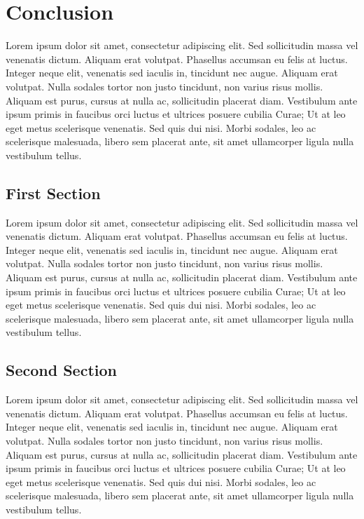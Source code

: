 \chapter{Conclusion}

Lorem ipsum dolor sit amet, consectetur adipiscing elit. Sed sollicitudin massa vel venenatis dictum. Aliquam erat volutpat. Phasellus accumsan eu felis at luctus. Integer neque elit, venenatis sed iaculis in, tincidunt nec augue. Aliquam erat volutpat. Nulla sodales tortor non justo tincidunt, non varius risus mollis. Aliquam est purus, cursus at nulla ac, sollicitudin placerat diam. Vestibulum ante ipsum primis in faucibus orci luctus et ultrices posuere cubilia Curae; Ut at leo eget metus scelerisque venenatis. Sed quis dui nisi. Morbi sodales, leo ac scelerisque malesuada, libero sem placerat ante, sit amet ullamcorper ligula nulla vestibulum tellus.

\section{First Section}
Lorem ipsum dolor sit amet, consectetur adipiscing elit. Sed sollicitudin massa vel venenatis dictum. Aliquam erat volutpat. Phasellus accumsan eu felis at luctus. Integer neque elit, venenatis sed iaculis in, tincidunt nec augue. Aliquam erat volutpat. Nulla sodales tortor non justo tincidunt, non varius risus mollis. Aliquam est purus, cursus at nulla ac, sollicitudin placerat diam. Vestibulum ante ipsum primis in faucibus orci luctus et ultrices posuere cubilia Curae; Ut at leo eget metus scelerisque venenatis. Sed quis dui nisi. Morbi sodales, leo ac scelerisque malesuada, libero sem placerat ante, sit amet ullamcorper ligula nulla vestibulum tellus.

\section{Second Section}
Lorem ipsum dolor sit amet, consectetur adipiscing elit. Sed sollicitudin massa vel venenatis dictum. Aliquam erat volutpat. Phasellus accumsan eu felis at luctus. Integer neque elit, venenatis sed iaculis in, tincidunt nec augue. Aliquam erat volutpat. Nulla sodales tortor non justo tincidunt, non varius risus mollis. Aliquam est purus, cursus at nulla ac, sollicitudin placerat diam. Vestibulum ante ipsum primis in faucibus orci luctus et ultrices posuere cubilia Curae; Ut at leo eget metus scelerisque venenatis. Sed quis dui nisi. Morbi sodales, leo ac scelerisque malesuada, libero sem placerat ante, sit amet ullamcorper ligula nulla vestibulum tellus.
